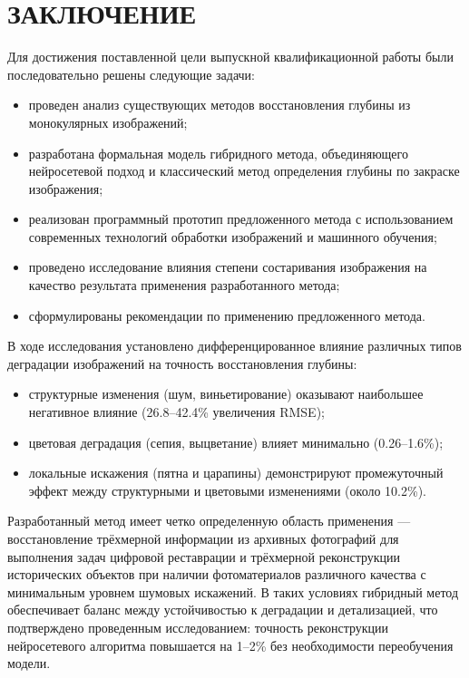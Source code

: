 \chapter*{ЗАКЛЮЧЕНИЕ}

Для достижения поставленной цели выпускной квалификационной работы были последовательно решены следующие задачи:

\begin{itemize}
    \item проведен анализ существующих методов восстановления глубины из монокулярных изображений;
    \item разработана формальная модель гибридного метода, объединяющего нейросетевой подход и классический метод определения глубины по закраске изображения;
    \item реализован программный прототип предложенного метода с использованием современных технологий обработки изображений и машинного обучения;
    \item проведено исследование влияния степени состаривания изображения на качество результата применения разработанного метода;
    \item сформулированы рекомендации по применению предложенного метода.
\end{itemize}

В ходе исследования установлено дифференцированное влияние различных типов деградации изображений на точность восстановления глубины:
\begin{itemize}
    \item структурные изменения (шум, виньетирование) оказывают наибольшее негативное влияние (26.8--42.4\% увеличения RMSE);
    \item цветовая деградация (сепия, выцветание) влияет минимально (0.26--1.6\%);
    \item локальные искажения (пятна и царапины) демонстрируют промежуточный эффект между структурными и цветовыми изменениями (около 10.2\%).
\end{itemize}

Разработанный метод имеет четко определенную область применения --- восстановление трёхмерной информации из архивных фотографий для выполнения задач цифровой реставрации и трёхмерной реконструкции исторических объектов
 при наличии фотоматериалов различного качества с минимальным уровнем шумовых искажений.
В таких условиях гибридный метод обеспечивает баланс между устойчивостью
к деградации и детализацией, что подтверждено проведенным исследованием:
точность реконструкции нейросетевого алгоритма повышается на 1--2\% без необходимости переобучения модели.

